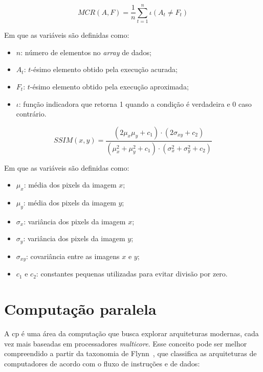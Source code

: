 \begin{equation}
    MCR(A, F) = \frac{1}{n} \sum^{n}_{t=1} \iota (A_t \neq F_t)
    \label{eq:mcr}
\end{equation}

Em que as variáveis são definidas como:
\begin{itemize}
    \item $n$: número de elementos no \textit{array} de dados;
    \item $A_t$: $t$-ésimo elemento obtido pela execução acurada;
    \item $F_t$: $t$-ésimo elemento obtido pela execução aproximada;
    \item $\iota$: função indicadora que retorna 1 quando a condição é verdadeira e 0 caso contrário.
\end{itemize}

\begin{equation}
    SSIM(x, y) = \frac{(2 \mu_x \mu_y + c_1) \cdot (2 \sigma_{xy} + c_2)}{(\mu_x^2 + \mu_y^2 + c_1) \cdot (\sigma_x^2 + \sigma_y^2 + c_2)}
    \label{eq:ssim}
\end{equation}

Em que as variáveis são definidas como:
\begin{itemize}
    \item $\mu_x$: média dos pixels da imagem $x$;
    \item $\mu_y$: média dos pixels da imagem $y$;
    \item $\sigma_x$: variância dos pixels da imagem $x$;
    \item $\sigma_y$: variância dos pixels da imagem $y$;
    \item $\sigma_{xy}$: covariância entre as imagens $x$ e $y$;
    \item $c_1$ e $c_2$: constantes pequenas utilizadas para evitar divisão por zero.
\end{itemize}

\section{Computação paralela}\label{sec:compParalela}

A \gls{cp} é uma área da computação que busca explorar arquiteturas modernas, cada vez mais baseadas em processadores \textit{multicore}. Esse conceito pode ser melhor compreendido a partir da taxonomia de Flynn~\cite{flynn1972}, que classifica as arquiteturas de computadores de acordo com o fluxo de instruções e de dados:

